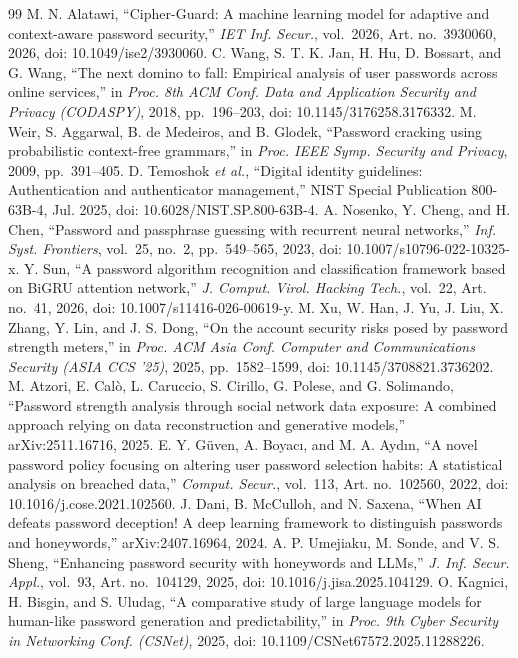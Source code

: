 \documentclass[preprint,12pt]{elsarticle}
\begin{document}
\begin{thebibliography}{99}
 M. N. Alatawi, ``Cipher-Guard: A machine learning model for adaptive and context-aware password security,'' \emph{IET Inf. Secur.}, vol.~2026, Art. no.~3930060, 2026, doi: 10.1049/ise2/3930060.
 C. Wang, S. T. K. Jan, H. Hu, D. Bossart, and G. Wang, ``The next domino to fall: Empirical analysis of user passwords across online services,'' in \emph{Proc. 8th ACM Conf. Data and Application Security and Privacy (CODASPY)}, 2018, pp.~196--203, doi: 10.1145/3176258.3176332.
 M. Weir, S. Aggarwal, B. de Medeiros, and B. Glodek, ``Password cracking using probabilistic context-free grammars,'' in \emph{Proc. IEEE Symp. Security and Privacy}, 2009, pp.~391--405.
 D. Temoshok \emph{et al.}, ``Digital identity guidelines: Authentication and authenticator management,'' NIST Special Publication 800-63B-4, Jul. 2025, doi: 10.6028/NIST.SP.800-63B-4.
 A. Nosenko, Y. Cheng, and H. Chen, ``Password and passphrase guessing with recurrent neural networks,'' \emph{Inf. Syst. Frontiers}, vol.~25, no.~2, pp.~549--565, 2023, doi: 10.1007/s10796-022-10325-x.
 Y. Sun, ``A password algorithm recognition and classification framework based on BiGRU attention network,'' \emph{J. Comput. Virol. Hacking Tech.}, vol.~22, Art. no.~41, 2026, doi: 10.1007/s11416-026-00619-y.
 M. Xu, W. Han, J. Yu, J. Liu, X. Zhang, Y. Lin, and J. S. Dong, ``On the account security risks posed by password strength meters,'' in \emph{Proc. ACM Asia Conf. Computer and Communications Security (ASIA CCS '25)}, 2025, pp.~1582--1599, doi: 10.1145/3708821.3736202.
 M. Atzori, E. Cal\`o, L. Caruccio, S. Cirillo, G. Polese, and G. Solimando, ``Password strength analysis through social network data exposure: A combined approach relying on data reconstruction and generative models,'' arXiv:2511.16716, 2025.
 E. Y. G\"uven, A. Boyac\i, and M. A. Ayd\i n, ``A novel password policy focusing on altering user password selection habits: A statistical analysis on breached data,'' \emph{Comput. Secur.}, vol.~113, Art. no.~102560, 2022, doi: 10.1016/j.cose.2021.102560.
 J. Dani, B. McCulloh, and N. Saxena, ``When AI defeats password deception! A deep learning framework to distinguish passwords and honeywords,'' arXiv:2407.16964, 2024.
 A. P. Umejiaku, M. Sonde, and V. S. Sheng, ``Enhancing password security with honeywords and LLMs,'' \emph{J. Inf. Secur. Appl.}, vol.~93, Art. no.~104129, 2025, doi: 10.1016/j.jisa.2025.104129.
 O. Kagnici, H. Bisgin, and S. Uludag, ``A comparative study of large language models for human-like password generation and predictability,'' in \emph{Proc. 9th Cyber Security in Networking Conf. (CSNet)}, 2025, doi: 10.1109/CSNet67572.2025.11288226.

\end{thebibliography}
\end{document}
